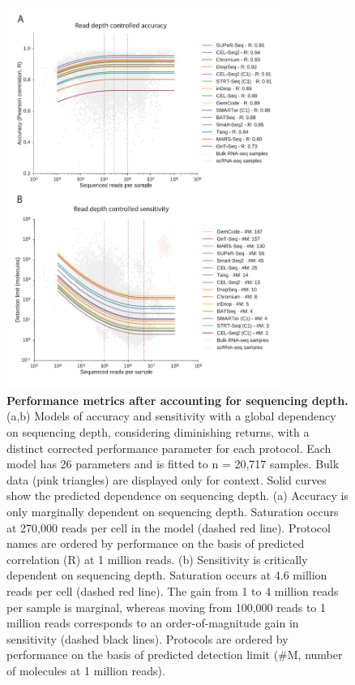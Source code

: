 \begin{figure}
    \centering
    \includegraphics[width=0.8\textwidth]{"Figure 3"}
    \caption[Performance metrics after accounting for sequencing depth]{\textbf{Performance metrics after accounting for sequencing depth.} (a,b) Models of accuracy and sensitivity with a global dependency on sequencing depth, considering diminishing returns, with a distinct corrected performance parameter for each protocol. Each model has 26 parameters and is fitted to n = 20,717 samples. Bulk data (pink triangles) are displayed only for context. Solid curves show the predicted dependence on sequencing depth. (a) Accuracy is only marginally dependent on sequencing depth. Saturation occurs at 270,000 reads per cell in the model (dashed red line). Protocol names are ordered by performance on the basis of predicted correlation (R) at 1 million reads. (b) Sensitivity is critically dependent on sequencing depth. Saturation occurs at 4.6 million reads per cell (dashed red line). The gain from 1 to 4 million reads per sample is marginal, whereas moving from 100,000 reads to 1 million reads corresponds to an order-of-magnitude gain in sensitivity (dashed black lines). Protocols are ordered by performance on the basis of predicted detection limit (\#M, number of molecules at 1 million reads).}
    \label{fig:depth}
\end{figure}

